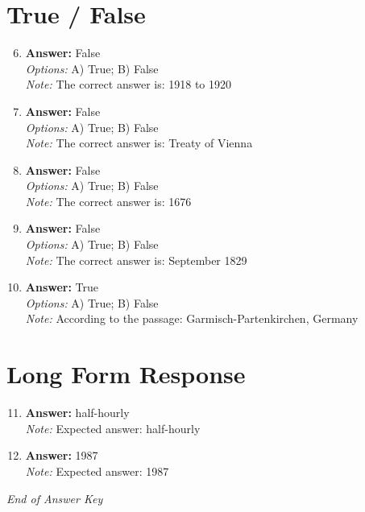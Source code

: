 \documentclass[12pt]{article}
\begin{document}
\section*{True / False}
\begin{enumerate}[label=\arabic*.]
\setcounter{enumi}{5}
\item \textbf{Answer:} False
\\ \textit{Options:} A) True; B) False
\\ \textit{Note:} The correct answer is: 1918 to 1920
\item \textbf{Answer:} False
\\ \textit{Options:} A) True; B) False
\\ \textit{Note:} The correct answer is: Treaty of Vienna
\item \textbf{Answer:} False
\\ \textit{Options:} A) True; B) False
\\ \textit{Note:} The correct answer is: 1676
\item \textbf{Answer:} False
\\ \textit{Options:} A) True; B) False
\\ \textit{Note:} The correct answer is: September 1829
\item \textbf{Answer:} True
\\ \textit{Options:} A) True; B) False
\\ \textit{Note:} According to the passage: Garmisch-Partenkirchen, Germany
\end{enumerate}

\section*{Long Form Response}
\begin{enumerate}[label=\arabic*.]
\setcounter{enumi}{10}
\item \textbf{Answer:} half-hourly
\\ \textit{Note:} Expected answer: half-hourly
\item \textbf{Answer:} 1987
\\ \textit{Note:} Expected answer: 1987
\end{enumerate}

\vfill
\noindent\textit{End of Answer Key}
\end{document}
